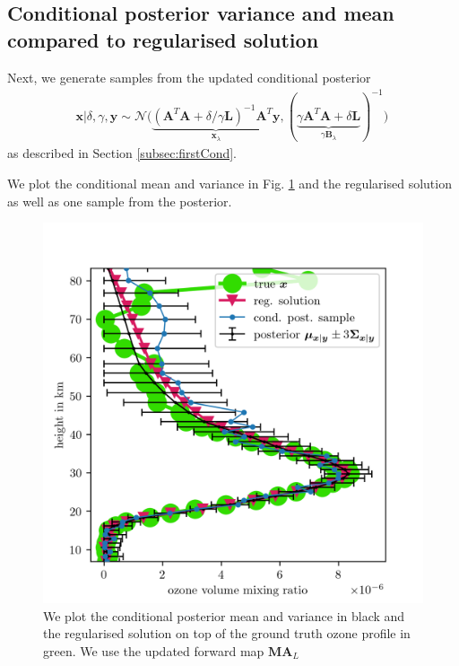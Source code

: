 \subsection{Conditional posterior variance and mean compared to regularised solution}
Next, we generate samples from the updated conditional posterior
\begin{align}
	\bm{x}| \delta, \gamma, \bm{y}  \sim \mathcal{N}\big( \underbrace{ (\bm{A}^T \bm{A} + \delta / \gamma \bm{L} )^{-1} \bm{A}^T \bm{y}}_{\bm{x}_{\lambda}}, ( \underbrace{ \gamma \bm{A}^T \bm{A} + \delta \bm{L} }_{\gamma \bm{B}_{\lambda}}  )^{-1} \big) \, \label{eq:UpdCondPost}
\end{align}
as described in Section \ref{subsec:firstCond}.

We plot the conditional mean and variance in Fig. \ref{fig:O3SolplsReg} and the regularised solution as well as one sample from the posterior.
\begin{figure}[ht!]
	\centering
	\includegraphics{SecRecResinclRegandSampl.png}
	\caption[Ozone posterior mean and variance and the regularised solution compared to the ground truth.]{We plot the conditional posterior mean and variance in black and the regularised solution on top of the ground truth ozone profile in green. We use the updated forward map $\bm{M}\bm{A}_L$}
	\label{fig:O3SolplsReg}
\end{figure}

